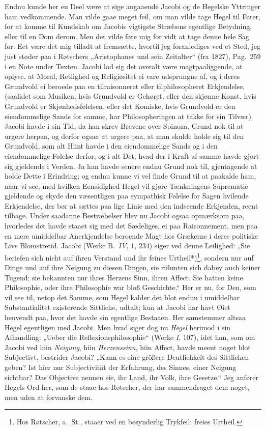\documentclass[12pt,a4paper]{book}
\newcommand{\apage}[1]{\marginnote{\footnotesize\textit{[#1]}}}
\begin{document}
%
Endnu kunde her en Deel være at sige angaaende Jacobi og de Hegelske Yttringer
ham vedkommende. Man vilde gaae meget feil, om man vilde tage Hegel til Fører,
for at komme til Kundskab om Jacobis vigtigste Stræbens egentlige Betydning,
eller til en Dom derom. Men det vilde føre mig for vidt at tage denne hele Sag
for. Eet være det mig tilladt at fremsætte, hvortil jeg foranlediges ved et
Sted, jeg just støder paa i Røtschers „Aristophanes und sein Zeitalter“ (fra
1827), Pag.\ 259 i en Note under Texten. Jacobi lod sig det overalt være
magtpaaliggende, at oplyse, at Moral, Retlighed og Religiøsitet ei vare
udsprungne af, og i deres Grundvold ei beroede paa en tilraisonneret eller
tilphilosopheret Erkjendelse, (saalidet som Musiken, hvis Grundvold er
Gehøret, eller den skjønne Konst, hvis Grundvold er Skjønhedsfølelsen, eller
det Komiske, hvis Grundvold er den eiendommelige Sands for samme, har
Philosopheringen at takke for sin Tilvær). Jacobi havde i sin Tid, da han skrev
Brevene over Spinoza, Grund nok til at urgere herpaa, og derfor ogsaa at
urgere paa, at man skulde holde sig til den Grundvold, som alt Hiint havde i
den eiendommelige Sands og i den eiendommelige Følelse derfor, og i alt Det,
hvad der i Kraft af samme havde gjort sig gjeldende i Verden. Ja han havde
senere endnu Grund nok til, gjentagende at holde Dette i Erindring; og endnu
kunne vi vel finde Grund til at paakalde ham, naar vi see, med hvilken
Eensidighed Hegel vil gjøre Tænkningens Suprematie gjeldende og skyde den
væsentligen paa sympathisk Følelse for Sagen hvilende Erkjendelse, der bør at
sættes \apage{121} paa lige Linie med den indseende Erkjenden, reent tilbage. Under
saadanne Bestræbelser blev nu Jacobi ogsaa opmærksom paa, hvorledes det havde
staaet sig med det Sædeliges, ei paa Raisonnement, men paa en mere umiddelbar
Anerkjendelse beroende Magt hos Grækerne i deres politiske Livs Blomstretid.
Jacobi (Werke B.\ \textit{IV}, 1, 234) siger ved denne Leilighed: „Sie beriefen sich
nicht auf ihren Verstand und ihr feines Urtheil*)\footnote{Hos Røtscher, a.\
St., staaer ved en besynderlig Trykfeil: freies Urtheil.}, sondern nur auf
Dinge und auf ihre Neigung zu diesen Dingen, sie rühmten sich dabey auch
keiner Tugend; sie bekannten nur ihres Herzens Sinn, ihren Affect. Sie hatten
keine Philosophie, oder ihre Philosophie war bloß Geschichte.“ Her er nu, for
Den, som vil see til, netop det Samme, som Hegel kalder det blot endnu i
umiddelbar Substantialitet existerende Sittliche, udtalt; kun at Jacobi har
havt Øiet henvendt paa, hvor det havde sin egentlige Bestaaen. Her samstemmer
altsaa Hegel egentligen med Jacobi. Men hvad siger dog nu \emph{Hegel} herimod i sin
Afhandling: „Ueber die Reflexionsphilosophie“ (Werke \textit{I}, 107), idet han, som om
Jacobi ved hiin \emph{Neigung}, hiin \emph{Herzenssinn}, hiin Affect, havde meent noget blot
Subjectivt, bestrider Jacobi? „Kann es eine größere Deutlichkeit des
Sittlichen geben? Ist hier nur Subjectivität der Erfahrung, des Sinnes, einer
Neigung sichtbar? Das Objective nennen sie, ihr Land, ihr Volk, ihre
Gesetze.“ Jeg anfører Hegels Ord her, som de staae hos Røtscher, der har
sammendraget dem noget, men uden at forvanske dem.
\end{document}
